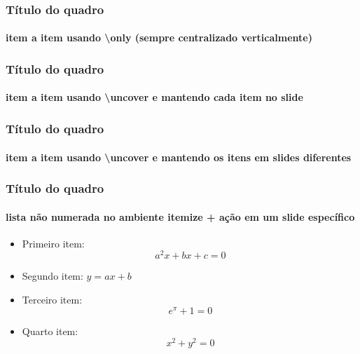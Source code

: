 \documentclass[aspectratio=43]{beamer}
\begin{document}
\begin{frame}
	\frametitle{Título do quadro}
	\framesubtitle{item a item usando \textbackslash only (sempre centralizado verticalmente)}
	
	
	
	
	
\end{frame}

\begin{frame}
	\frametitle{Título do quadro}
	\framesubtitle{item a item usando \textbackslash uncover e mantendo cada item no slide}
	
	
	
	
	
\end{frame}

\begin{frame}
	\frametitle{Título do quadro}
	\framesubtitle{item a item usando \textbackslash uncover e mantendo os itens em slides diferentes}
	
	
	
	
	
\end{frame}

\begin{frame}
	\frametitle{Título do quadro}
	\framesubtitle{lista não numerada no ambiente itemize + ação em um slide específico}
	
	\begin{itemize}	
	\item<1- | alert@3> Primeiro item:
		\[ a^2x + bx +c = 0\]
	
	\item<2- | alert@2-4> Segundo item: $y = ax + b$
	
	\item<3- | alert@3> Terceiro item:
		$$ e^\pi + 1 = 0 $$
	
	\item<4- | alert@4> Quarto item:
		$$ x^2 + y^2 = 0 $$
	
	\end{itemize}
	
\end{frame}
	
\end{document}

